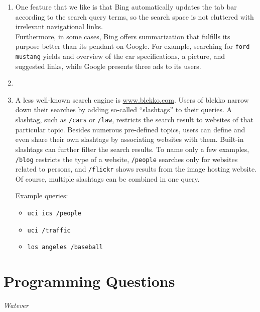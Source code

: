 \documentclass[a4paper,11pt,oneside]{book}
\newcommand{\todo}[1]{\textcolor{red}{\textbf{TODO: #1}}}
\begin{document}
\begin{enumerate}
				5 Google corrected the name - cristina
				9 bing gives answer~ :)
				10 general term. Both look for different meanings
				\todo{5 more queries, some with numerous keywords}
				
				\todo{Conclusion, what do we like better?}
	\item One feature that we like is that Bing automatically updates the tab bar according to the search query  terms, so the search space is not cluttered with irrelevant navigational links. \\
		Furthermore, in some cases, Bing offers summarization that fulfills its purpose better than its pendant on Google. For example, searching for \texttt{ford mustang} yields and overview of the car specifications, a picture, and suggested links, while Google presents three ads to its users.
	\item
	\item A less well-known search engine is \url{www.blekko.com}. Users of blekko narrow down their searches by adding so-called ``slashtags'' to their queries. A slashtag, such as \texttt{/cars} or \texttt{/law}, restricts the search result to websites of that particular topic. Besides numerous pre-defined topics, users can define and even share their own slashtags by associating websites with them. Built-in slashtags can further filter the search results. To name only a few examples, \texttt{/blog} restricts the type of a website, \texttt{/people} searches only for websites related to persons, and \texttt{/flickr} shows results from the image hosting website. Of course, multiple slashtags can be combined in one query.
	
	Example queries:
	\begin{itemize}
		\item \texttt{uci ics /people}
		\item \texttt{uci /traffic}
		\item \texttt{los angeles /baseball}
	\end{itemize}
 \end {enumerate}
\chapter{Programming Questions}

\pagebreak
\begin{thebibliography}{XXX}
 {\it Watever}


\end{thebibliography}
\end{document}
